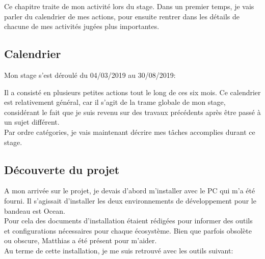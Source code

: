 \documentclass{rapport}
\begin{document}
Ce chapitre traite de mon activité lors du stage. Dans un premier temps, je vais parler du calendrier de mes actions, pour ensuite rentrer dans les détails de chacune de mes activités jugées plus importantes.

\subsection{Calendrier}

Mon stage s'est déroulé du 04/03/2019 au 30/08/2019:\\


Il a consisté en plusieurs petites actions tout le long de ces six mois. Ce calendrier est relativement général, car il s'agit de la trame globale de mon stage, considérant le fait  que je suis revenu sur des travaux précédents après être passé à un sujet différent.\\

Par ordre catégories, je vais maintenant décrire mes tâches accomplies durant ce stage. 

\newpage
\subsection{Découverte du projet}

A mon arrivée sur le projet, je devais d'abord m'installer avec le PC qui m'a été fourni. Il s'agissait d'installer les deux environnements de développement pour le bandeau est Ocean.\\
Pour cela des documents d'installation étaient rédigées pour informer des outils et configurations nécessaires pour chaque écosystème. Bien que parfois obsolète ou obscure, Matthias a été présent pour m'aider.\\

Au terme de cette installation, je me suis retrouvé avec les outils suivant:\\
\end{document}
